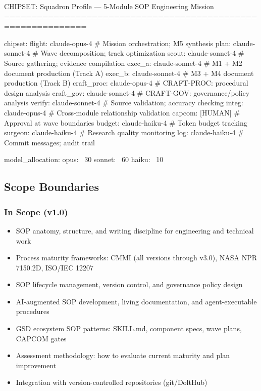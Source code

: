 \documentclass[11pt,letterpaper]{article}
\begin{document}
\begin{asciibox}
  CHIPSET: Squadron Profile — 5-Module SOP Engineering Mission
  =============================================================

  chipset:
    flight: claude-opus-4        # Mission orchestration; M5 synthesis
    plan:   claude-sonnet-4      # Wave decomposition; track optimization
    scout:  claude-sonnet-4      # Source gathering; evidence compilation
    exec_a: claude-sonnet-4      # M1 + M2 document production (Track A)
    exec_b: claude-sonnet-4      # M3 + M4 document production (Track B)
    craft_proc: claude-opus-4    # CRAFT-PROC: procedural design analysis
    craft_gov:  claude-sonnet-4  # CRAFT-GOV: governance/policy analysis
    verify: claude-sonnet-4      # Source validation; accuracy checking
    integ:  claude-opus-4        # Cross-module relationship validation
    capcom: [HUMAN]              # Approval at wave boundaries
    budget: claude-haiku-4       # Token budget tracking
    surgeon: claude-haiku-4      # Research quality monitoring
    log:    claude-haiku-4       # Commit messages; audit trail

  model_allocation:
    opus:   ~30%
    sonnet: ~60%
    haiku:  ~10%
\end{asciibox}

\subsection{Scope Boundaries}

\subsubsection{In Scope (v1.0)}
\begin{itemize}[leftmargin=1.5em]
  \item SOP anatomy, structure, and writing discipline for engineering and technical work
  \item Process maturity frameworks: CMMI (all versions through v3.0), NASA NPR 7150.2D, ISO/IEC 12207
  \item SOP lifecycle management, version control, and governance policy design
  \item AI-augmented SOP development, living documentation, and agent-executable procedures
  \item GSD ecosystem SOP patterns: SKILL.md, component specs, wave plans, CAPCOM gates
  \item Assessment methodology: how to evaluate current maturity and plan improvement
  \item Integration with version-controlled repositories (git/DoltHub)
\end{itemize}
\end{document}
